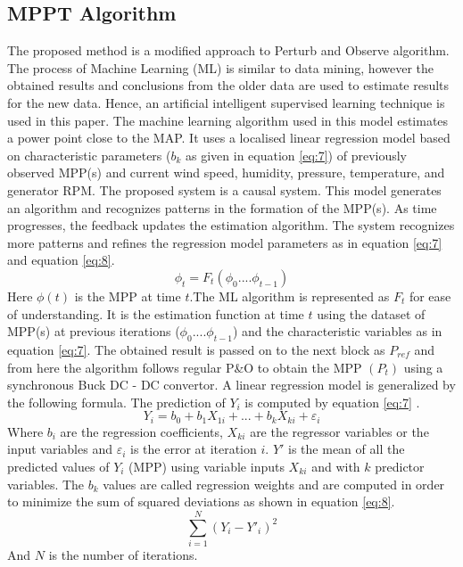 \subsection{MPPT Algorithm}
The proposed method is a modified approach to Perturb and Observe algorithm. The process of Machine Learning (ML) is similar to data mining, however the obtained results and conclusions from the older data are used to estimate results for the new data. Hence, an artificial intelligent supervised learning technique is used in this paper. The machine learning algorithm used in this model estimates a power point close to the MAP. It uses a localised linear regression model based on characteristic parameters ($b_k$ as given in equation \ref{eq:7}) of previously observed MPP(s) and current wind speed, humidity, pressure, temperature, and generator RPM. The proposed system is a causal system. This model generates an algorithm and recognizes patterns in the formation of the MPP(s). As time progresses, the feedback updates the estimation algorithm. The system recognizes more patterns and refines the regression model parameters as in equation \ref{eq:7} and equation \ref{eq:8}. 
\begin{equation} \label{eq:6}
\phi_t =F_t( \phi_0 .... \phi_{t-1}) 
\end{equation}
Here $\phi(t)$ is the MPP at time $t$.The ML algorithm is represented as $F_t$  for ease of understanding. It is the estimation function at time $t$ using the dataset of MPP(s) at previous iterations ($ \phi_0 .... \phi_{t-1}$) and the characteristic variables as in equation \ref{eq:7}. The obtained result is passed on to the next block as $ P_{ref}$ and from here the algorithm follows regular P\&O to obtain the MPP $(P_t)$ using a synchronous Buck DC - DC convertor. A linear regression model is generalized by the following formula. The prediction of $Y_i$ is computed by equation \ref{eq:7} \cite{RefJ15}.
\begin{equation} \label{eq:7}
Y_i= b_0 + b_1 X_{1i} + ... + b_k X_{ki} + \varepsilon_i 
\end{equation}
Where $b_i$ are the regression coefficients, $X_{ki}$ are the regressor variables or the input variables and $\varepsilon_i$ is the error at iteration $i$.  $Y'$ is the mean of all the predicted values of $Y_i$ (MPP) using variable inputs $ X_{ki}$ and with $ k$ predictor variables. The $b_{k}$ values are called regression weights and are computed in order to minimize the sum of squared deviations as shown in equation \ref{eq:8}.
\begin{equation} \label{eq:8}
\sum_{i= 1 }^{N} (Y_i - Y'_i)^2
\end{equation}
And $N$ is the number of iterations. 
